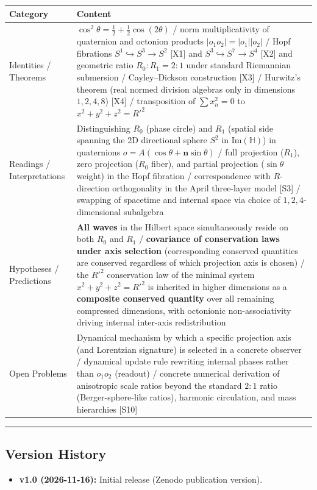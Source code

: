 \documentclass[
  a4paper,
]{article}
\newcounter{none} %
\providecommand{\tightlist}{%
  \setlength{\itemsep}{0pt}\setlength{\parskip}{0pt}}
\begin{document}
{\def\LTcaptype{none} %
\begin{longtable}[]{@{}
  >{\raggedright\arraybackslash}p{}
  >{\raggedright\arraybackslash}p{}@{}}
\toprule\noalign{}
\begin{minipage}[b]{\linewidth}\raggedright
Category
\end{minipage} & \begin{minipage}[b]{\linewidth}\raggedright
Content
\end{minipage} \\
\midrule\noalign{}
\endhead
\bottomrule\noalign{}
\endlastfoot
Identities / Theorems &
\(\cos^2\theta = \frac{1}{2} + \frac{1}{2}\cos(2\theta)\) / norm
multiplicativity of quaternion and octonion products
\(|o_1 o_2| = |o_1||o_2|\) / Hopf fibrations
\(S^1 \hookrightarrow S^3 \to S^2\) {[}X1{]} and
\(S^3 \hookrightarrow S^7 \to S^4\) {[}X2{]} and geometric ratio
\(R_0 : R_1 = 2 : 1\) under standard Riemannian submersion /
Cayley--Dickson construction {[}X3{]} / Hurwitz's theorem (real normed
division algebras only in dimensions \(1, 2, 4, 8\)) {[}X4{]} /
transposition of \(\sum x_n^2 = 0\) to \(x^2+y^2+z^2 = R'^2\) \\
Readings / Interpretations & Distinguishing \(R_0\) (phase circle) and
\(R_1\) (spatial side spanning the 2D directional sphere \(S^2\) in
\(\mathrm{Im}(\mathbb{H})\)) in quaternions
\(o = A(\cos\theta + \mathbf{n}\sin\theta)\) / full projection
(\(R_1\)), zero projection (\(R_0\) fiber), and partial projection
(\(\sin\theta\) weight) in the Hopf fibration / correspondence with
\(R\)-direction orthogonality in the April three-layer model {[}S3{]} /
swapping of spacetime and internal space via choice of
\(1, 2, 4\)-dimensional subalgebra \\
Hypotheses / Predictions & \textbf{All waves} in the Hilbert space
simultaneously reside on both \(R_0\) and \(R_1\) / \textbf{covariance
of conservation laws under axis selection} (corresponding conserved
quantities are conserved regardless of which projection axis is chosen)
/ the \(R'^2\) conservation law of the minimal system
\(x^2+y^2+z^2=R'^2\) is inherited in higher dimensions as a
\textbf{composite conserved quantity} over all remaining compressed
dimensions, with octonionic non-associativity driving internal
inter-axis redistribution \\
Open Problems & Dynamical mechanism by which a specific projection axis
(and Lorentzian signature) is selected in a concrete observer /
dynamical update rule rewriting internal phases rather than \(o_1 o_2\)
(readout) / concrete numerical derivation of anisotropic scale ratios
beyond the standard \(2:1\) ratio (Berger-sphere-like ratios), harmonic
circulation, and mass hierarchies {[}S10{]} \\
\end{longtable}
}

\begin{center}\rule{0.5\linewidth}{0.5pt}\end{center}

\subsection{Version History}\label{version-history}

\begin{itemize}
\tightlist
\item
  \textbf{v1.0 (2026-11-16):} Initial release (Zenodo publication
  version).
\end{itemize}
\end{document}
